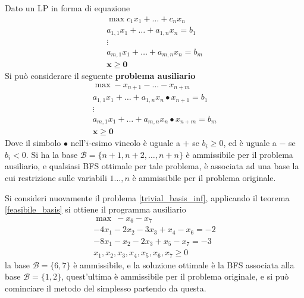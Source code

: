 \documentclass[10pt, letterpaper]{report}
\newcommand{\x}{{\mathbf{x}}}
\begin{document}
\begin{teorema}\label{feasibile_basis}
    Dato un LP in forma di equazione \begin{eqnarray*}
        \max c_1x_1+\dots + c_nx_n\\ 
        a_{1,1}x_1+\dots + a_{1,n}x_n = b_1\\
        \vdots \\ 
        a_{m,1}x_1+\dots + a_{m,n}x_n = b_m\\
        \x \ge \mathbf 0
    \end{eqnarray*}
    Si può considerare il seguente \textbf{problema ausiliario}\begin{eqnarray*}
        \max -x_{n+1}-\dots - x_{n+m}\\ 
        a_{1,1}x_1+\dots + a_{1,n}x_n \bullet x_{n+1}= b_1\\
        \vdots \\ 
        a_{m,1}x_1+\dots + a_{m,n}x_n \bullet x_{n+m}= b_m\\
        \x \ge \mathbf 0
    \end{eqnarray*}
    Dove il simbolo $\bullet$ nell'$i$-esimo vincolo è uguale a $+$ se $b_i\ge 0$, ed è uguale a $-$ se $b_i<0$. Si ha la base $\mathcal B=\{n+1,n+2,\dots,n+n\}$ è ammissibile per il problema ausiliario, e qualsiasi BFS ottimale per tale problema, è associata ad una base la cui restrizione sulle variabili $1\dots, n$ è ammissibile per il problema originale.
\end{teorema}
Si consideri nuovamente il problema \ref{trivial_basis_inf}, applicando il teorema \ref{feasibile_basis} si ottiene il programma ausiliario 
\begin{equation}\label{ausiliairio}\begin{matrix}
    \max \ -x_6-x_7\\ 
    -4x_1-2x_2-3x_3+x_4-x_6= -2 \\ 
    -8x_1-x_2-2x_3+x_5-x_7= -3\\ 
    x_1,x_2,x_3,x_4,x_5,x_6,x_7\ge 0 \end{matrix}
\end{equation}
la base $\mathcal B = \{6,7\}$ è ammissibile, e la soluzione ottimale è la BFS associata alla base $\mathcal B = \{1,2\}$, quest'ultima è ammissibile per il problema originale, e si può cominciare il metodo del simplesso partendo da questa.
\end{document}

